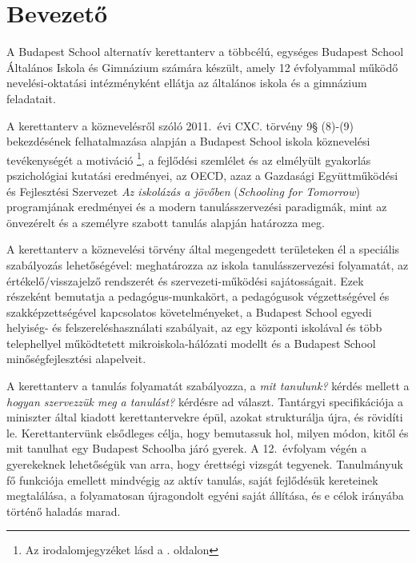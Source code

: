 \chapter{Bevezető}
A Budapest School alternatív kerettanterv a többcélú, egységes	Budapest School
Általános Iskola és Gimnázium számára készült, amely 12 évfolyammal működő
nevelési-oktatási intézményként ellátja az általános iskola és a gimnázium
feladatait.

A kerettanterv a köznevelésről szóló 2011.~évi CXC. törvény 9§ (8)-(9)
bekezdésének felhatalmazása alapján a Budapest School iskola köznevelési
tevékenységét a motiváció \citep{pink2011drive}\footnote{Az irodalomjegyzéket
    lásd a \pageref{sec:bibliographyk}. oldalon}, a fejlődési szemlélet
\citep{growthmindset} és az elmélyült gyakorlás \citep{ericsson2016peak}
pszichológiai kutatási eredményei, az  OECD, azaz a Gazdasági Együttműködési és
Fejlesztési Szervezet \emph{Az iskolázás a jövőben}  (\emph{Schooling for Tomorrow})
programjának eredményei \citep{2006schooling}
és a modern tanulásszervezési paradigmák, mint az önvezérelt
\citep{mitra2012beyond} és a személyre szabott \citep{khan2012one} tanulás
alapján határozza meg.

A kerettanterv a köznevelési törvény által megengedett területeken él a
speciális szabályozás lehetőségével: meghatározza az iskola tanulásszervezési
folyamatát, az értékelő/visszajelző rendszerét és szervezeti-működési
sajátosságait. Ezek részeként bemutatja a pedagógus-munkakört, a pedagógusok
végzettségével és szakképzettségével kapcsolatos követelményeket, a Budapest
School	egyedi helyiség- és felszereléshasználati szabályait, az egy központi
iskolával és több telephellyel működtetett mikroiskola-hálózati modellt és a
Budapest School minőségfejlesztési alapelveit.

A kerettanterv	a tanulás folyamatát szabályozza, a \emph{mit tanulunk?} kérdés
mellett a \emph{hogyan szervezzük meg a tanulást?} kérdésre ad választ.
Tantárgyi specifikációja a miniszter által kiadott kerettantervekre
\citep{ofi:kerettanterv} épül, azokat strukturálja újra, és rövidíti le.
Kerettantervünk elsődleges célja, hogy bemutassuk hol, milyen módon, kitől és
mit tanulhat egy Budapest Schoolba járó gyerek. A 12.~évfolyam
végén a gyerekeknek lehetőségük van arra, hogy érettségi vizsgát tegyenek. Tanulmányuk
fő funkciója emellett mindvégig az aktív tanulás, saját fejlődésük kereteinek
megtalálása, a folyamatosan újragondolt egyéni saját állítása, és e célok
irányába történő haladás marad.

